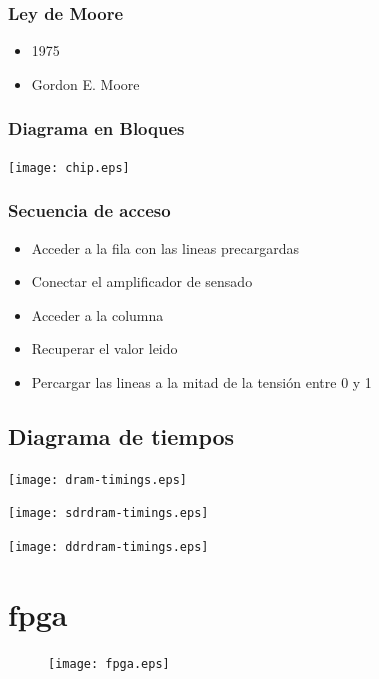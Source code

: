 \documentclass{beamer}
\begin{document}
\begin{frame}
\frametitle{Ley de Moore}
	\begin{itemize}
		\item 1975
		\item Gordon E. Moore
	\end{itemize}
\end{frame}

\begin{frame}
\frametitle{Diagrama en Bloques}
	\begin{center}
		\texttt{[image: chip.eps]}
	\end{center}
\end{frame}

\begin{frame}
\frametitle{Secuencia de acceso}
	\begin{itemize}
		\item Acceder a la fila con las lineas precargardas
		\item Conectar el amplificador de sensado
		\item Acceder a la columna
		\item Recuperar el valor leido
		\item Percargar las lineas a la mitad de la tensión entre 0 y 1
	\end{itemize}
\end{frame}

\subsection{Diagrama de tiempos}
\begin{frame}
	\begin{center}
		\texttt{[image: dram-timings.eps]}
	\end{center}
\end{frame}

\begin{frame}
	\begin{center}
		\texttt{[image: sdrdram-timings.eps]}
	\end{center}
\end{frame}

\begin{frame}
	\begin{center}
		\texttt{[image: ddrdram-timings.eps]}
	\end{center}
\end{frame}

\section{fpga}
\begin{frame}
\begin{figure}[!htb]
\centering
\texttt{[image: fpga.eps]}
\end{figure}
\end{frame}
\end{document}
